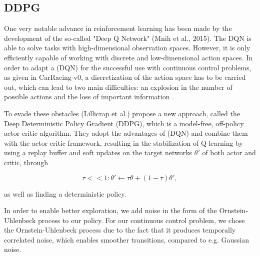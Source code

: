 \documentclass[letterpaper, 10 pt, conference]{ieeeconf}  %
\begin{document}
\subsection{DDPG}
One very notable advance in reinforcement learning has been made by the development of the so-called "Deep Q Network" (Mnih et al., 2015). The DQN is able to solve tasks with high-dimensional observation spaces. However, it is only efficiently capable of working with discrete and low-dimensional action spaces. In order to adapt a (DQN) for the successful use with continuous control problems, as given in CarRacing-v0, a discretization of the action space has to be carried out, which can lead to two main difficulties: an explosion in the number of possible actions and the loss of important information \cite{lillicrapContinuousControlDeep2015}.

To evade these obstacles (Lillicrap et al.) propose a new approach, called the Deep Deterministic Policy Gradient (DDPG), which is a model-free, off-policy actor-critic algorithm. They adopt the advantages of (DQN) and combine them with the actor-critic framework, resulting in the stabilization of Q-learning by using a replay buffer and soft updates on the target networks $\theta'$ of both actor and critic, through

\begin{equation}
\tau << 1:\theta' \leftarrow \tau\theta + (1-\tau)\theta',
\end{equation}

as well as finding a deterministic policy.

In order to enable better exploration, we add noise in the form of the Ornstein-Uhlenbeck process to our policy. For our continuous control problem, we chose the Ornstein-Uhlenbeck process due to the fact that it produces temporally correlated noise, which enables smoother transitions, compared to e.g. Gaussian noise. 
\end{document}
